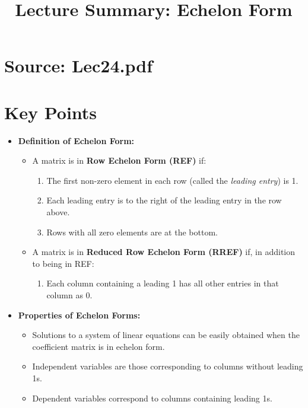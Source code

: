 \documentclass{article}
\title{Lecture Summary: Echelon Form}
\author{}
\date{}
\begin{document}
\maketitle

\section*{Source: Lec24.pdf}

\section*{Key Points}

\begin{itemize}
  \item \textbf{Definition of Echelon Form:}
    \begin{itemize}
      \item A matrix is in \textbf{Row Echelon Form (REF)} if:
        \begin{enumerate}
          \item The first non-zero element in each row (called the \textit{leading entry}) is 1.
          \item Each leading entry is to the right of the leading entry in the row above.
          \item Rows with all zero elements are at the bottom.
        \end{enumerate}
      \item A matrix is in \textbf{Reduced Row Echelon Form (RREF)} if, in addition to being in REF:
        \begin{enumerate}
          \item Each column containing a leading 1 has all other entries in that column as 0.
        \end{enumerate}
    \end{itemize}

  \item \textbf{Properties of Echelon Forms:}
    \begin{itemize}
      \item Solutions to a system of linear equations can be easily obtained when the coefficient matrix is in echelon form.
      \item Independent variables are those corresponding to columns without leading 1s.
      \item Dependent variables correspond to columns containing leading 1s.
    \end{itemize}


\end{itemize}
\end{document}

